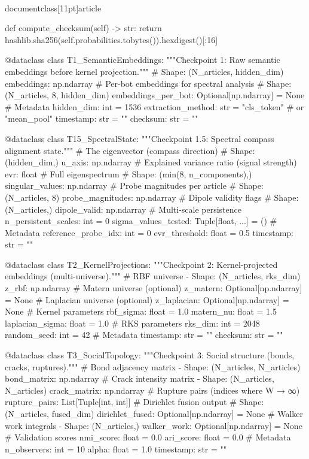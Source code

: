 \\documentclass[11pt]{article}
\begin{document}
\begin{CodeBlock}
    def compute_checksum(self) -> str:
        return hashlib.sha256(self.probabilities.tobytes()).hexdigest()[:16]


@dataclass
class T1_SemanticEmbeddings:
    """Checkpoint 1: Raw semantic embeddings before kernel projection."""
    # Shape: (N_articles, hidden_dim)
    embeddings: np.ndarray
    # Per-bot embeddings for spectral analysis
    # Shape: (N_articles, 8, hidden_dim)
    embeddings_per_bot: Optional[np.ndarray] = None
    # Metadata
    hidden_dim: int = 1536
    extraction_method: str = "cls_token"  # or "mean_pool"
    timestamp: str = ""
    checksum: str = ""


@dataclass
class T15_SpectralState:
    """Checkpoint 1.5: Spectral compass alignment state."""
    # The eigenvector (compass direction)
    # Shape: (hidden_dim,)
    u_axis: np.ndarray
    # Explained variance ratio (signal strength)
    evr: float
    # Full eigenspectrum
    # Shape: (min(8, n_components),)
    singular_values: np.ndarray
    # Probe magnitudes per article
    # Shape: (N_articles, 8)
    probe_magnitudes: np.ndarray
    # Dipole validity flags
    # Shape: (N_articles,)
    dipole_valid: np.ndarray
    # Multi-scale persistence
    n_persistent_scales: int = 0
    sigma_values_tested: Tuple[float, ...] = ()
    # Metadata
    reference_probe_idx: int = 0
    evr_threshold: float = 0.5
    timestamp: str = ""


@dataclass
class T2_KernelProjections:
    """Checkpoint 2: Kernel-projected embeddings (multi-universe)."""
    # RBF universe - Shape: (N_articles, rks_dim)
    z_rbf: np.ndarray
    # Matern universe (optional)
    z_matern: Optional[np.ndarray] = None
    # Laplacian universe (optional)
    z_laplacian: Optional[np.ndarray] = None
    # Kernel parameters
    rbf_sigma: float = 1.0
    matern_nu: float = 1.5
    laplacian_sigma: float = 1.0
    # RKS parameters
    rks_dim: int = 2048
    random_seed: int = 42
    # Metadata
    timestamp: str = ""
    checksum: str = ""


@dataclass
class T3_SocialTopology:
    """Checkpoint 3: Social structure (bonds, cracks, ruptures)."""
    # Bond adjacency matrix - Shape: (N_articles, N_articles)
    bond_matrix: np.ndarray
    # Crack intensity matrix - Shape: (N_articles, N_articles)
    crack_matrix: np.ndarray
    # Rupture pairs (indices where W → ∞)
    rupture_pairs: List[Tuple[int, int]]
    # Dirichlet fusion output
    # Shape: (N_articles, fused_dim)
    dirichlet_fused: Optional[np.ndarray] = None
    # Walker work integrals - Shape: (N_articles,)
    walker_work: Optional[np.ndarray] = None
    # Validation scores
    nmi_score: float = 0.0
    ari_score: float = 0.0
    # Metadata
    n_observers: int = 10
    alpha: float = 1.0
    timestamp: str = ""



\end{CodeBlock}
\end{document}
